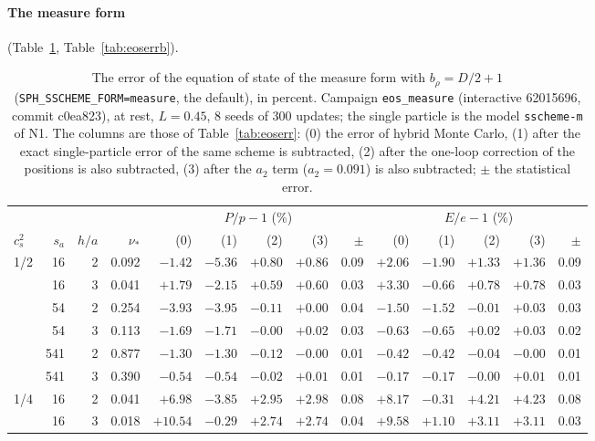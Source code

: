 \documentclass[11pt,aps,preprint,nofootinbib,superscriptaddress,tightenlines]{revtex4-2}
\def\Tab#1{Table~\ref{#1}}
\let\oldparagraph\paragraph
\renewcommand{\paragraph}{\par\bigskip\oldparagraph}
\begin{document}
\paragraph{The measure form} (\Tab{tab:eoserrm}, \Tab{tab:eoserrb}).
\begin{table}[h]
\caption{The error of the equation of state of the measure form with $b_\rho=D/2+1$ (\texttt{SPH\_SSCHEME\_FORM=measure}, the default), in percent.  Campaign \texttt{eos\_measure} (interactive 62015696, commit c0ea823), at rest, $L=0.45$, 8 seeds of 300 updates; the single particle is the model \texttt{sscheme-m} of N1. The columns are those of \Tab{tab:eoserr}: (0) the error of hybrid Monte Carlo, (1) after the exact single-particle error of
the same scheme is subtracted, (2) after the one-loop correction of the positions is also subtracted, (3) after the $a_2$ term ($a_2=0.091$) is also
subtracted; $\pm$ the statistical error.}
\label{tab:eoserrm}
\begin{center}\small
\begin{tabular}{lrrr|rrrrr|rrrrr}
\toprule
 & & & & \multicolumn{5}{c|}{$P/p-1$ (\%)} & \multicolumn{5}{c}{$E/e-1$ (\%)} \\
$c_s^2$ & $s_a$ & $h/a$ & $\nu_*$ & (0) & (1) & (2) & (3) & $\pm$ & (0) & (1) & (2) & (3) & $\pm$ \\
\midrule
1/2 & 16 & 2 & 0.092 & $-1.42$ & $-5.36$ & $+0.80$ & $+0.86$ & 0.09 & $+2.06$ & $-1.90$ & $+1.33$ & $+1.36$ & 0.09 \\
 & 16 & 3 & 0.041 & $+1.79$ & $-2.15$ & $+0.59$ & $+0.60$ & 0.03 & $+3.30$ & $-0.66$ & $+0.78$ & $+0.78$ & 0.03 \\
 & 54 & 2 & 0.254 & $-3.93$ & $-3.95$ & $-0.11$ & $+0.00$ & 0.04 & $-1.50$ & $-1.52$ & $-0.01$ & $+0.03$ & 0.03 \\
 & 54 & 3 & 0.113 & $-1.69$ & $-1.71$ & $-0.00$ & $+0.02$ & 0.03 & $-0.63$ & $-0.65$ & $+0.02$ & $+0.03$ & 0.02 \\
 & 541 & 2 & 0.877 & $-1.30$ & $-1.30$ & $-0.12$ & $-0.00$ & 0.01 & $-0.42$ & $-0.42$ & $-0.04$ & $-0.00$ & 0.01 \\
 & 541 & 3 & 0.390 & $-0.54$ & $-0.54$ & $-0.02$ & $+0.01$ & 0.01 & $-0.17$ & $-0.17$ & $-0.00$ & $+0.01$ & 0.01 \\
\midrule
1/4 & 16 & 2 & 0.041 & $+6.98$ & $-3.85$ & $+2.95$ & $+2.98$ & 0.08 & $+8.17$ & $-0.31$ & $+4.21$ & $+4.23$ & 0.08 \\
 & 16 & 3 & 0.018 & $+10.54$ & $-0.29$ & $+2.74$ & $+2.74$ & 0.04 & $+9.58$ & $+1.10$ & $+3.11$ & $+3.11$ & 0.03 \\

\end{tabular}
\end{center}
\end{table}
\end{document}
